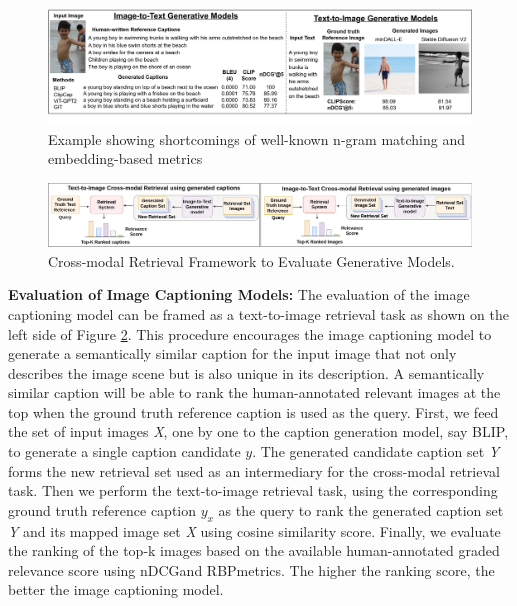 \begin{figure}[htbp]
\centering
\includegraphics[width=\textwidth]{Figures/demo_two.png}
\vspace*{-8mm}
\caption{Example showing shortcomings of well-known n-gram matching and embedding-based metrics}
\label{fig:demo}
\end{figure}

\begin{figure}[htbp]
\centering
\includegraphics[width=\textwidth]{Figures/both.png}
\vspace*{-8mm}
\caption{Cross-modal Retrieval Framework to Evaluate Generative Models.}
\label{fig:framework}
\end{figure}

\noindent\textbf{Evaluation of Image Captioning Models:}
The evaluation of the image captioning model can be framed as a text-to-image retrieval task as shown on the left side of Figure \ref{fig:framework}. This procedure encourages the image captioning model to generate a semantically similar caption for the input image that not only describes the image scene but is also unique in its description. A semantically similar caption will be able to rank the human-annotated relevant images at the top when the ground truth reference caption is used as the query. First, we feed the set of input images \textit{X}, one by one to the caption generation model, say BLIP, to generate a single caption candidate $y$. The generated candidate caption set \textit{Y} forms the new retrieval set used as an intermediary for the cross-modal retrieval task. Then we perform the text-to-image retrieval task, using the corresponding ground truth reference caption $y_x$ as the query to rank the generated caption set \textit{Y} and its mapped image set \textit{X} using cosine similarity score. Finally, we evaluate the ranking of the top-k images based on the available human-annotated graded relevance score using nDCG\textquotesingle@K and RBP\textquotesingle@K metrics. The higher the ranking score, the better the image captioning model.

